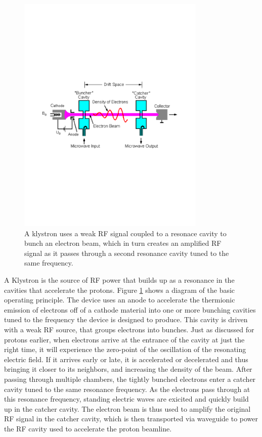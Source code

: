 \begin{figure}[h]
   \centering
  \includegraphics[width=0.8\textwidth]{Figures/LHC_Diagrams/LHC_KlystronBasic.pdf}
  \caption{A klystron uses a weak RF signal coupled to a resonace
    cavity to bunch an electron beam, which in turn creates an
    amplified RF signal as it passes through a second resonance cavity
    tuned to the same frequency.} \label{fig:lhc_klystron_operation}
\end{figure}

\par A Klystron is the source of RF power that builds up as a
resonance in the cavities that accelerate the protons.  Figure
\ref{fig:lhc_klystron_operation} shows a diagram of the basic
operating principle.  The device uses an anode to accelerate the
thermionic emission of electrons off of a cathode material into one or
more bunching cavities tuned to the frequency the device is designed
to produce.  This cavity is driven with a weak RF source, that groups
electrons into bunches.  Just as discussed for protons earlier, when
electrons arrive at the entrance of the cavity at just the right time,
it will experience the zero-point of the oscillation of the resonating
electric field.  If it arrives early or late, it is accelerated or
decelerated and thus bringing it closer to its neighbors, and
increasing the density of the beam.  After passing through multiple
chambers, the tightly bunched electrons enter a catcher cavity tuned
to the same resonance frequency.  As the electrons pass through at
this resonance frequency, standing electric waves are exicited and
quickly build up in the catcher cavity.  The electron beam is thus
used to amplify the original RF signal in the catcher cavity, which is
then transported via waveguide to power the RF cavity used to
accelerate the proton beamline.  

